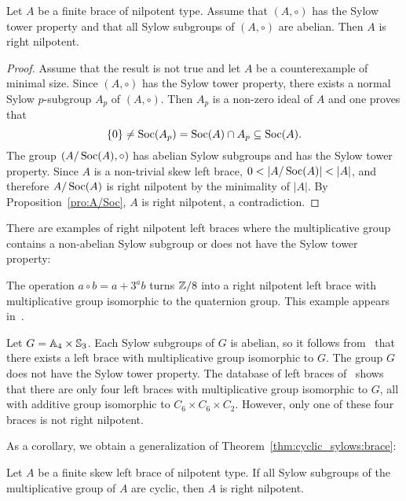 \begin{corollary}
\label{cor:STP+abelian}
	Let $A$ be a finite brace of nilpotent type. Assume that 
	$(A,\circ)$ has the Sylow tower property and that 
	all Sylow subgroups of $(A,\circ)$ are abelian. 
	Then $A$ is right nilpotent.
\end{corollary}

\begin{proof}
    Assume that the result is not true and let $A$ be a counterexample of minimal size. 
    Since $(A,\circ)$ has the Sylow tower property, there exists a normal Sylow $p$-subgroup $A_p$ of $(A,\circ)$. Then $A_p$ is a non-zero ideal of $A$
    and one proves that 
    \[
    \{0\}\ne\operatorname{Soc}(A_p)=\operatorname{Soc}(A)\cap A_p\subseteq\operatorname{Soc}(A).
    \]
    The 
    group $(A/\operatorname{Soc}(A),\circ)$ has abelian Sylow subgroups 
    and has the Sylow tower property. Since $A$ is a non-trivial
    skew left brace, $0<|A/\Soc(A)|<|A|$, and therefore $A/\operatorname{Soc}(A)$ 
    is right nilpotent by the minimality of $|A|$. 
    By Proposition~\ref{pro:A/Soc}, $A$ is right nilpotent, a contradiction.
\end{proof}

There are examples of right nilpotent left braces where the multiplicative 
group contains a non-abelian Sylow subgroup or does not have the Sylow tower property:

\begin{example}
    The operation $a\circ b=a+3^ab$ turns $\mathbb{Z}/8$ into a right nilpotent left brace with multiplicative group isomorphic to the quaternion group. This example appears in~\cite{MR3320237}.
\end{example}

\begin{example}
    Let $G=\mathbb{A}_4\times\mathbb{S}_3$. Each Sylow subgroups of $G$ is abelian, so it follows from~\cite[Theorem 2.1]{cjo} that there exists a left brace with multiplicative group isomorphic to $G$. The group $G$ does not have the Sylow tower property. The database of left braces of~\cite{MR3647970} shows that there are only four left braces with multiplicative group isomorphic to $G$, all with additive group isomorphic to $C_6\times C_6\times C_2$. However, only one of these four braces is not right nilpotent. 
\end{example}

As a corollary, we obtain a generalization of Theorem~\ref{thm:cyclic_sylows:brace}:

\begin{corollary}
    Let $A$ be a finite skew left brace of nilpotent type. 
    If all Sylow subgroups of the multiplicative
    group of $A$ are cyclic, then $A$ is right nilpotent.
\end{corollary}

